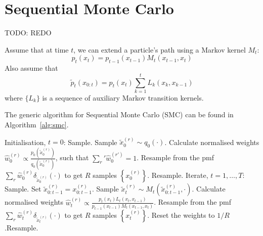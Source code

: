 \section{Sequential Monte Carlo}
TODO: REDO

Assume that at time $t$, we can extend a particle's path using a Markov kernel $M_t$:
\begin{equation}
    p_t(x_t) = p_{t-1}(x_{t-1}) M_t(x_{t-1}, x_t)
\end{equation}
Also assume that
\begin{equation}
    \tilde p_t(x_{0:t}) = p_t(x_t) \sum_{k = 1}^t{L_k(x_k, x_{k-1})}
\end{equation}
where $\{L_k\}$ is a sequence of auxiliary Markov transition kernels.

The generic algorithm for Sequential Monte Carlo (SMC) can be found in Algorithm~\ref{alg:smc}.
    \begin{algorithmbis}\label{alg:smc}
        \begin{algorithmic}[1]
            \State Initialisation, $t = 0$:
                \Comment Sample.
                \State Sample $\tilde x_0^{(r)} \sim q_0(\cdot)$.
            \EndFor
                \State Calculate normalised weights $\hat w_0^{(r)} \propto \frac{p_0\left(\tilde x_0^{(r)}\right)}{q_0\left(\tilde x_0^{(r)}\right)}$, such that $\sum_r' \hat w_0^{(r')} = 1$.
            \EndFor
            \State Resample from the pmf $\sum_r \hat w_0^{(r)} \delta_{\tilde x_0^{(r)}}(\cdot)$ to get $R$ samples $\left\{x_0^{(r)}\right\}$. \Comment Resample.
            \State
            \State Iterate, $t = 1, \dotsc, T$:
                    \Comment Sample.
                    \State Set $\tilde x_{0:t-1}^{(r)} = x_{0:t-1}^{(r)}$.
                    \State Sample $\tilde x_t^{(r)} \sim M_t\left(\tilde x_{0:t-1}^{(r)}, \cdot\right)$.
                \EndFor
                    \State Calculate normalised weights $\hat w_t^{(r)} \propto \frac{p_t(x_t) L_t(x_t, x_{t-1})}{p_{t-1}(x_{t-1}) M_t(x_{t-1}, x_t)}$.
                \EndFor
                \State Resample from the pmf $\sum_r \hat w_t^{(r)} \delta_{\tilde x_t^{(r)}}(\cdot)$ to get $R$ samples $\left\{x_t^{(r)}\right\}$. Reset the weights to $1/R$.\Comment Resample.
            \EndFor
        \end{algorithmic}
    \end{algorithmbis}

